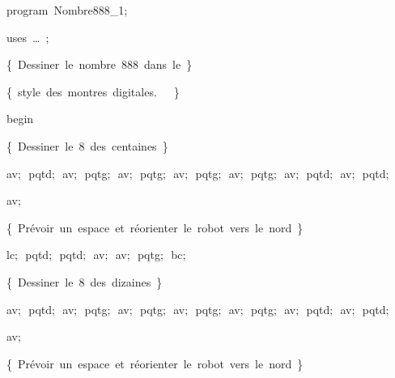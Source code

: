 
{
\parindent {}
\medskip

\carrenoir
\vspace{\neglskip}\mbox{\blc  \idt  \mcl program\idt \ Nombre888\_1$;$
}\par 
\vspace{\neglskip}\mbox{\blc \blk\idt \mcl uses\idt \ \ldots\ $;$
}\par 
\medskip

\vspace{\neglskip}\mbox{\blc  \idt  \cmt  \{\ Dessiner\ le\ nombre\ 888\ dans\ le\ \}\idt }\par 
\vspace{\neglskip}\mbox{\blc  \idt  \cmt  \{\ style\ des\ montres\ digitales.\ \ \ \}\idt }\par 
\medskip

\vspace{\neglskip}\mbox{\blc  \idt  \mcl begin\idt }\par 
\vspace{\neglskip}\mbox{\blc  \blk\idt  \cmt  \{\ Dessiner\ le\ 8\ des\ centaines\ \}\idt }\par 
\vspace{\neglskip}\mbox{\blc  \blk\idt  av$;$\ pqtd$;$\ av$;$\ pqtg$;$\ av$;$\ pqtg$;$\ av$;$\ pqtg$;$\ av$;$\ pqtg$;$\ av$;$\ pqtd$;$\ av$;$\ pqtd$;$}\par 
\vspace{\neglskip}\mbox{\blc  \blk\idt  av$;$}\par 
\vspace{\neglskip}\mbox{\blc  \blk\idt  \cmt  \{\ Prévoir\ un\ espace\ et\ réorienter\ le\ robot\ vers\ le\ nord\ \}\idt }\par 
\vspace{\neglskip}\mbox{\blc  \blk\idt  lc$;$\ pqtd$;$\ pqtd$;$\ av$;$\ av$;$\ pqtg$;$\ bc$;$\ }\par 
\vspace{\neglskip}\mbox{\blc  \blk\idt  \cmt  \{\ Dessiner\ le\ 8\ des\ dizaines\ \}\idt }\par 
\vspace{\neglskip}\mbox{\blc  \blk\idt  av$;$\ pqtd$;$\ av$;$\ pqtg$;$\ av$;$\ pqtg$;$\ av$;$\ pqtg$;$\ av$;$\ pqtg$;$\ av$;$\ pqtd$;$\ av$;$\ pqtd$;$}\par 
\vspace{\neglskip}\mbox{\blc  \blk\idt  av$;$}\par 
\vspace{\neglskip}\mbox{\blc  \blk\idt  \cmt  \{\ Prévoir\ un\ espace\ et\ réorienter\ le\ robot\ vers\ le\ nord\ \}\idt }\par 
}
